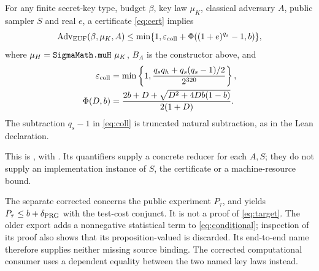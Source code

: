 \begin{mdframed}[nobreak=true,linewidth=0.6pt,innerleftmargin=8pt,innerrightmargin=8pt]
\begin{theorem}\label{thm:conditional}
For any finite secret-key type, budget $\beta$, key law $\mu_K$, classical
adversary $A$, public sampler $S$ and real $e$, a certificate
\eqref{eq:cert} implies
\begin{equation}\label{eq:conditional}
 \operatorname{Adv}_{\mathrm{EUF}}(\beta,\mu_K,A)
 \leq \min\{1,\varepsilon_{\mathrm{coll}}+\Phi((1+e)^{q_s}-1,b)\},
\end{equation}
where $\mu_H=\code{SigmaMath.muH}\ \mu_K$, $B_A$ is the constructor
above, and
\begin{align}
 \varepsilon_{\mathrm{coll}}&=\min\left\{1,
 \frac{q_s q_h+q_s(q_s-1)/2}{2^{320}}\right\},\label{eq:coll}\\
 \Phi(D,b)&=\frac{2b+D+\sqrt{D^2+4Db(1-b)}}{2(1+D)}.
 \label{eq:phi}
\end{align}
The subtraction $q_s-1$ in \eqref{eq:coll} is truncated natural
subtraction, as in the Lean declaration.
\end{theorem}
\end{mdframed}
This is , with
. Its quantifiers supply a concrete
reducer for each $A,S$; they do not supply an implementation instance of
$S$, the certificate or a machine-resource bound.

The separate corrected 
concerns the public experiment $P_\tau$, and yields
$P_\tau\leq b+\delta_{\mathrm{PRG}}$ with the test-cost conjunct. It is not a proof of
\eqref{eq:target}. The older  export adds a nonnegative
statistical term to \eqref{eq:conditional}; inspection of its proof
also shows that its proposition-valued  is discarded.
Its end-to-end name therefore supplies neither missing source binding.
The corrected computational consumer uses a dependent equality between
the two named key laws instead.


